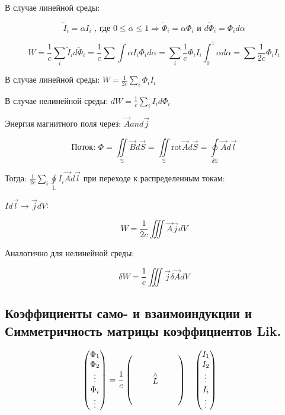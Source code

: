 В случае линейной среды:

\[
\tilde{I}_i=\alpha I_i \text{ , где }0\leqslant \alpha\leqslant 1 \Rightarrow \tilde{\Phi}_i=\alpha \Phi_i \text{ и } d\tilde{\Phi}_i=\Phi_i d\alpha
\]

\[
W=\frac{1}{c} \sum_{i}\tilde{I}_id\tilde{\Phi}_i=\frac{1}{c}\sum \int \alpha I_i \Phi_i d\alpha=\sum_{i}\frac{1}{c}\Phi_i I_i \int_{0}^1\alpha d\alpha=\sum \frac{1}{2c}\Phi_i I_i    
\]

В случае линейной среды: \( \boxed{W=\frac{1}{2c}\sum_{i}\Phi_iI_i } \) 

В случае нелинейной среды: \( \boxed{dW=\frac{1}{c}\sum_{i}I_id\Phi_i } \) 

Энергия магнитного поля через: \( \vec{A} and \vec{j} \) 

\[
\text{Поток: } \Phi=\underset{\mathbb{S}}{\iint}\vec{B}d\vec{S}=\underset{\mathbb{S}}{\iint}\mathrm{rot}\vec{A}d\vec{S}=\underset{\delta\mathbb{S}}{\oint}\vec{A}d\vec{l} 
\]

Тогда: \( \frac{1}{2c}\sum_{i}\underset{\mathbb{L}}{\oint}I_i \vec{A}d\vec{l}  \) при переходе к распределенным токам: 

\( Id\vec{l}\rightarrow\vec{j}dV \):

\[
\boxed{W=\frac{1}{2c}\iiint \vec{A}\vec{j}dV }
\]

Аналогично для нелинейной среды: 

\[
\boxed{\delta W=\frac{1}{c}\iiint \vec{j}\delta \vec{A} dV }
\]

\subsection*{Коэффициенты само-
и взаимоиндукции и Симметричность матрицы коэффициентов Lik.}

\[
    \begin{pmatrix}
        \Phi_1 \\
        \Phi_2 \\
        \vdots \\
        \Phi_i \\
        \vdots
        \end{pmatrix}
        =
        \renewcommand{\arraystretch}{1.8} %
        \setlength{\arraycolsep}{1.2em}   %
        \frac{1}{c} 
        \begin{pmatrix}
           &   &   \\
           & \overset{\wedge}{L} &   \\
           &   &  
        \end{pmatrix}
        \quad
        \renewcommand{\arraystretch}{1.} 
        \setlength{\arraycolsep}{1.2em}   
        \begin{pmatrix}
        I_1 \\
        I_2 \\
        \vdots \\
        I_i \\
        \vdots
        \end{pmatrix}
        \quad
\]

